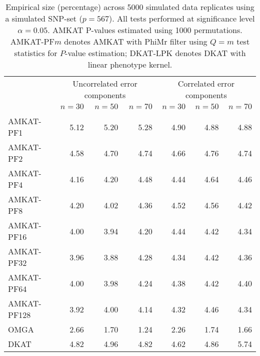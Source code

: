 \documentclass[a4paper,oneside,10pt]{article}\usepackage[]{graphicx}\usepackage[]{color}
\newenvironment{knitrout}{}{} %
\begin{document}
\begin{knitrout}
\color{fgcolor}\begin{table}

\caption{\label{tab:size_snp}Empirical size (percentage) across 5000 simulated data replicates  using a simulated SNP-set ($p = 567$). All tests performed at significance level $\alpha = 0.05$. AMKAT P-values estimated using 1000 permutations. AMKAT-PF$m$ denotes AMKAT with PhiMr filter using $Q=m$ test statistics for $P$-value estimation; DKAT-LPK denotes DKAT with linear phenotype kernel.}
\centering
\begin{tabular}[t]{lrrrrrr}
\toprule
\multicolumn{1}{c}{ } & \multicolumn{3}{c}{Uncorrelated error components} & \multicolumn{3}{c}{Correlated error components} \\
\cmidrule(l{3pt}r{3pt}){2-4} \cmidrule(l{3pt}r{3pt}){5-7}
  & $n = 30$ & $n = 50$ & $n = 70$ & $n = 30$ & $n = 50$ & $n = 70$\\
\midrule
\addlinespace[0.3em]
\multicolumn{7}{l}{\textbf{Multivariate normal errors}}\\
\hspace{1em}AMKAT-PF1 & 5.12 & 5.20 & 5.28 & 4.90 & 4.88 & 4.88\\
\hspace{1em}AMKAT-PF2 & 4.58 & 4.70 & 4.74 & 4.66 & 4.76 & 4.74\\
\hspace{1em}AMKAT-PF4 & 4.16 & 4.20 & 4.48 & 4.44 & 4.64 & 4.46\\
\hspace{1em}AMKAT-PF8 & 4.20 & 4.02 & 4.36 & 4.52 & 4.56 & 4.42\\
\hspace{1em}AMKAT-PF16 & 4.00 & 3.94 & 4.20 & 4.44 & 4.42 & 4.34\\
\hspace{1em}AMKAT-PF32 & 3.96 & 3.88 & 4.28 & 4.34 & 4.42 & 4.36\\
\hspace{1em}AMKAT-PF64 & 4.00 & 3.98 & 4.24 & 4.38 & 4.42 & 4.40\\
\hspace{1em}AMKAT-PF128 & 3.92 & 4.00 & 4.14 & 4.32 & 4.46 & 4.34\\
\hspace{1em}OMGA & 2.66 & 1.70 & 1.24 & 2.26 & 1.74 & 1.66\\
\hspace{1em}DKAT & 4.82 & 4.96 & 4.82 & 4.62 & 4.86 & 5.74\\

\end{tabular}
\end{table}
\end{knitrout}
\end{document}
